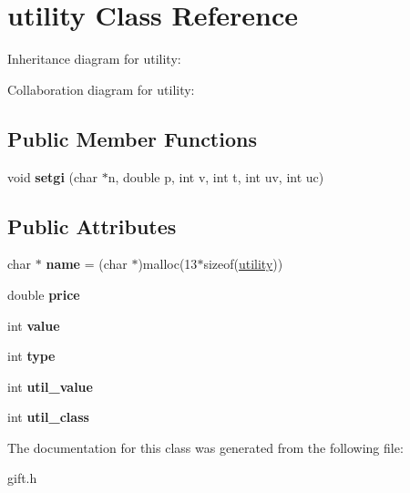 \hypertarget{classutility}{}\section{utility Class Reference}
\label{classutility}


Inheritance diagram for utility\+:


Collaboration diagram for utility\+:
\subsection*{Public Member Functions}
\begin{DoxyCompactItemize}
\item 
void {\bfseries setgi} (char $\ast$n, double p, int v, int t, int uv, int uc)\hypertarget{classutility_a0cde2f788544e42b0d6dae5eff7c4f24}{}\label{classutility_a0cde2f788544e42b0d6dae5eff7c4f24}

\end{DoxyCompactItemize}
\subsection*{Public Attributes}
\begin{DoxyCompactItemize}
\item 
char $\ast$ {\bfseries name} = (char $\ast$)malloc(13$\ast$sizeof(\hyperlink{classutility}{utility}))\hypertarget{classutility_a2cbf0bad246ade7432ae33651868b819}{}\label{classutility_a2cbf0bad246ade7432ae33651868b819}

\item 
double {\bfseries price}\hypertarget{classutility_ac69b072608d427939f0910f153107bc6}{}\label{classutility_ac69b072608d427939f0910f153107bc6}

\item 
int {\bfseries value}\hypertarget{classutility_a6ce96364c45c28cf7dacf3a5bb51a2e0}{}\label{classutility_a6ce96364c45c28cf7dacf3a5bb51a2e0}

\item 
int {\bfseries type}\hypertarget{classutility_a47cc5dde88a84e9719566b782a0c1856}{}\label{classutility_a47cc5dde88a84e9719566b782a0c1856}

\item 
int {\bfseries util\+\_\+value}\hypertarget{classutility_afb799ffc97374c660b039ad683c26251}{}\label{classutility_afb799ffc97374c660b039ad683c26251}

\item 
int {\bfseries util\+\_\+class}\hypertarget{classutility_a57406bed435437d3c39194bbc4b70a6e}{}\label{classutility_a57406bed435437d3c39194bbc4b70a6e}

\end{DoxyCompactItemize}


The documentation for this class was generated from the following file\+:\begin{DoxyCompactItemize}
\item 
gift.\+h\end{DoxyCompactItemize}
